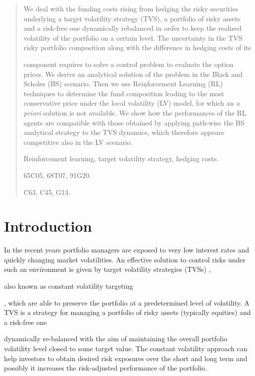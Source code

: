 \documentclass[runningheads]{m2ef}
\newcommand\soutpars[1]{\let\helpcmd\sout\parhelp#1\par\relax\relax}
\newcommand{\change}[1]{{\color{red} {#1}}}%
\newcommand{\remove}[1]{{\color{red} \soutpars{{#1}}}}%
\begin{document}
\begin{abstract}
We deal with the funding costs rising from hedging the risky securities underlying a target volatility strategy (TVS), a portfolio of risky assets and a risk-free one dynamically rebalanced in order to keep the realized volatility of the portfolio on a certain level. The uncertainty in the TVS risky portfolio composition along with the difference in hedging costs \change{of its} \remove{for each} component requires to solve a control problem to evaluate the option prices. We derive an analytical solution of the problem in the Black and Scholes (BS) scenario. Then we use Reinforcement Learning (RL) techniques to determine the fund composition leading to the most conservative price under the local volatility (LV) model, for which an {\it a priori} solution is not available. We show how the performances of the RL agents are compatible with those obtained by applying path-wise the BS analytical strategy to the TVS dynamics, which therefore appears competitive also in the LV scenario.

\smallskip

 Reinforcement learning, target volatility strategy, hedging costs.

\smallskip

 \textsc{\small 65C05, 68T07, 91G20.}

 \textsc{\small C63, C45, G13.}
\end{abstract}

\bigskip

\section{Introduction}
In the recent years portfolio managers are exposed to very low interest rates and quickly changing market volatilities. An effective solution to control risks under such an environment is given by target volatility strategies (TVSs)\change{,} \remove{(}also known as constant volatility targeting\remove{)}\change{,} which are able to preserve the portfolio at a predetermined level of volatility. A TVS is \change{a strategy for managing} a portfolio of risky assets (typically  equities) and a risk-free \change{one} \remove{asset} dynamically re-balanced with the aim of maintaining the overall portfolio volatility level closed to some target value. The constant volatility approach can help investors to obtain desired risk exposures over the short and long term and \change{possibly} it increases the risk-adjusted performance of the portfolio.
\end{document}
